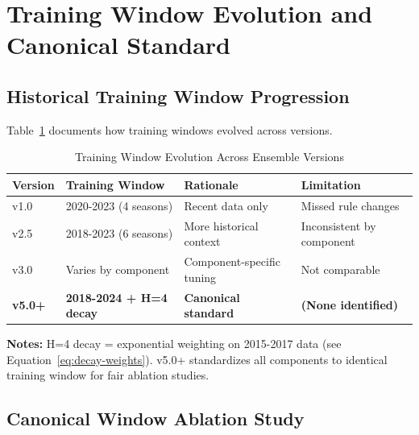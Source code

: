 \section{Training Window Evolution and Canonical Standard}
\label{sec:arch-training-window}

\subsection{Historical Training Window Progression}

Table~\ref{tab:training-window-evolution} documents how training windows evolved across versions.

\begin{table}[htbp]
\centering
\caption{Training Window Evolution Across Ensemble Versions}
\label{tab:training-window-evolution}
\small
\begin{tabular}{@{} l l l l @{}}
\toprule
\textbf{Version} & \textbf{Training Window} & \textbf{Rationale} & \textbf{Limitation} \\
\midrule
v1.0 & 2020-2023 (4 seasons) & Recent data only & Missed rule changes \\
v2.5 & 2018-2023 (6 seasons) & More historical context & Inconsistent by component \\
v3.0 & Varies by component & Component-specific tuning & Not comparable \\
\textbf{v5.0+} & \textbf{2018-2024 + H=4 decay} & \textbf{Canonical standard} & \textbf{(None identified)} \\
\bottomrule
\end{tabular}

\vspace{2mm}
\begin{minipage}{\linewidth}
\small
\textbf{Notes:} H=4 decay = exponential weighting on 2015-2017 data (see Equation~\ref{eq:decay-weights}). v5.0+ standardizes all components to identical training window for fair ablation studies.
\end{minipage}
\end{table}

\subsection{Canonical Window Ablation Study}

